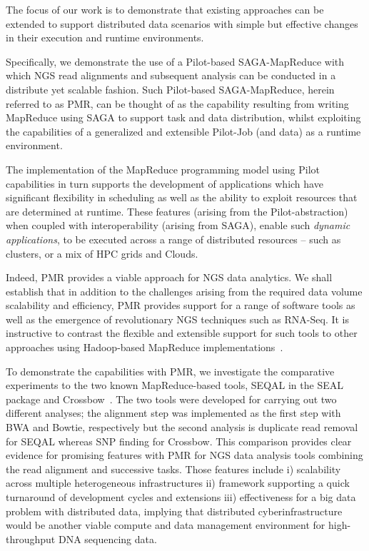 \documentclass{sig-alternate}
\begin{document}
{The focus of our work is to demonstrate that existing approaches can
be extended to support distributed data scenarios with simple but
effective changes in their execution and runtime environments.

Specifically, we demonstrate the use of a Pilot-based SAGA-MapReduce
with which NGS read alignments and subsequent analysis can be
conducted in a distribute yet scalable fashion. Such Pilot-based
SAGA-MapReduce, herein referred to as PMR, can be thought of as the
capability resulting from writing MapReduce using SAGA to support task
and data distribution, whilst exploiting the capabilities of a
generalized and extensible Pilot-Job (and data) as a runtime
environment\cite{Sehgal2011590,pmr2012,pstar11}.

The implementation of the MapReduce programming model using Pilot
capabilities in turn supports the development of applications which
have significant flexibility in scheduling as well as the ability to
exploit resources that are determined at runtime.  These features
(arising from the Pilot-abstraction) when coupled with
interoperability (arising from SAGA), enable such {\it dynamic
  applications}, to be executed across a range of distributed
resources -- such as clusters, or a mix of HPC grids and Clouds.

Indeed, PMR provides a viable approach for NGS data analytics.  We
shall establish that in addition to the challenges arising from the
required data volume scalability and efficiency, PMR provides support
for a range of software tools as well as the emergence of
revolutionary NGS techniques such as RNA-Seq.  It is instructive to
contrast the flexible and extensible support for such tools to other
approaches using Hadoop-based MapReduce
implementations~\cite{cloudburst,langmead2009,seal2011,langmead2010}.

To demonstrate the capabilities with PMR, we investigate the
comparative experiments to the two known MapReduce-based tools, SEQAL
in the SEAL package and Crossbow~\cite{seal2011,langmead2010}.  The
two tools were developed for carrying out two different analyses; the
alignment step was implemented as the first step with BWA and Bowtie,
respectively but the second analysis is duplicate read removal for
SEQAL whereas SNP finding for Crossbow.  This comparison provides
clear evidence for promising features with PMR for NGS data analysis
tools combining the read alignment and successive tasks.  Those
features include i) scalability across multiple heterogeneous
infrastructures ii) framework supporting a quick turnaround of
development cycles and extensions iii) effectiveness for a big data
problem with distributed data, implying that distributed
cyberinfrastructure would be another viable compute and data
management environment for high-throughput DNA sequencing data.

}
\end{document}
